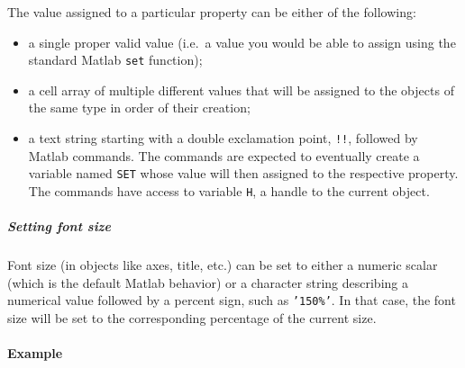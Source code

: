 The value assigned to a particular property can be either of the
following:

\begin{itemize}
\item
  a single proper valid value (i.e.~a value you would be able to assign
  using the standard Matlab \texttt{set} function);
\item
  a cell array of multiple different values that will be assigned to the
  objects of the same type in order of their creation;
\item
  a text string starting with a double exclamation point, \texttt{!!},
  followed by Matlab commands. The commands are expected to eventually
  create a variable named \texttt{SET} whose value will then assigned to
  the respective property. The commands have access to variable
  \texttt{H}, a handle to the current object.
\end{itemize}

\subparagraph{Setting font size}\label{setting-font-size}

Font size (in objects like axes, title, etc.) can be set to either a
numeric scalar (which is the default Matlab behavior) or a character
string describing a numerical value followed by a percent sign, such as
\texttt{'150\%'}. In that case, the font size will be set to the
corresponding percentage of the current size.

\paragraph{Example}\label{example}


